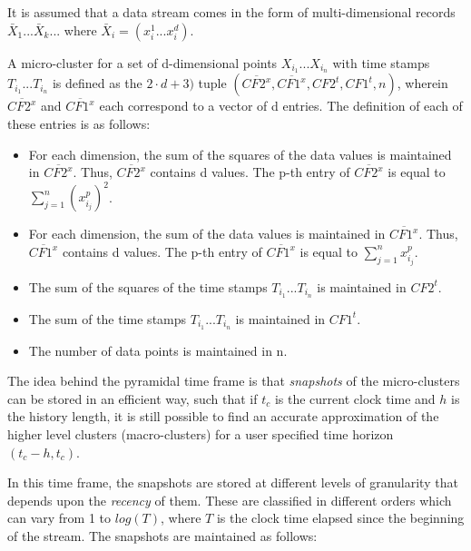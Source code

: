 It is assumed that a data stream comes in the form of multi-dimensional records $\bar X_1 ... \bar X_k ...$ where $\bar X_i = (x^1_i ... x^d_i)$.

\begin{definition}\cite{clustreamOrig}

A micro-cluster for a set of d-dimensional points $X_{i_1} ...X_{i_n}$ with time stamps
$T_{i_1} ...T_{i_n}$ is defined as the $2 \cdot d + 3)$ tuple $(\overline{CF2^x},\overline{CF1^x},CF2^t,CF1^t,n)$, wherein $\overline{CF2^x}$ and $\overline{CF1^x}$ each correspond to a vector of d entries. The definition of each of these entries is as follows: 

\begin{itemize}
 \item For each dimension, the sum of the squares of the data values is maintained in $\overline{CF2^x}$. Thus, $\overline{CF2^x}$ contains d values. The p-th entry of $\overline{CF2^x}$ is equal to $\sum^n_{j=1} (x^p_{i_j})^2$. 
 \item For each dimension, the sum of the data values is maintained in $\overline{CF1^x}$. Thus, $\overline{CF1^x}$ contains d values. The p-th entry of $\overline{CF1^x}$ is equal to $\sum^n_{j=1} x^p_{i_j}$.
 \item The sum of the squares of the time stamps $T_{i_1} ...T_{i_n}$ is maintained in $CF2^t$.
 \item The sum of the time stamps $T_{i_1} ...T_{i_n}$ is maintained in $CF1^t$.
 \item The number of data points is maintained in n.
\end{itemize}

\end{definition}

The idea behind the pyramidal time frame is that \textit{snapshots} of the micro-clusters can be stored in an efficient way, such that if $t_c$ is the current clock time and $h$ is the history length, it is still possible to find an accurate approximation of the higher level clusters (macro-clusters) for a user specified time horizon $(t_c - h, t_c)$.

In this time frame, the snapshots are stored at different levels of granularity that depends upon the \textit{recency} of them. These are classified in different orders which can vary from 1 to $log(T)$, where $T$ is the clock time elapsed since the beginning of the stream. The snapshots are maintained as follows:

